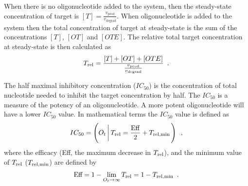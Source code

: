 \documentclass[a4paper,11pt]{article}
\newcommand{\vp}{v_{\mathrm{prod}}}
\newcommand{\vd}{v_{\mathrm{degrad}}}
\newcommand{\Trel}{T_{\rm{rel}}}
\newcommand{\Trelmin}{T_{\rm{rel,min}}}
\begin{document}
When there is no oligonucleotide added to the system, then the steady-state concentration of target is $[T]=\frac{\vp}{ \vd}$. When oligonucleotide is added to the system then the total concentration of target at steady-state is the sum of the concentrations $[T]$, $[OT]$ and $[OTE]$. The relative total target concentration at steady-state is then calculated as 
\begin{equation}
\Trel = \frac{[T]+[OT]+[OTE]}{\frac{\vp}{ \vd}} \enspace.
\end{equation}

The half maximal inhibitory concentration ($IC_{50}$) is the concentration of total nucleotide needed to inhibit the target concentration by half. The $IC_{50}$ is a measure of the potency of an oligonucleotide. A more potent oligonucleotide will have a lower $IC_{50}$ value. In mathematical terms the $IC_{50}$ value is defined as
\begin{equation}
IC_{50} = \left(O_t \left|\, \Trel = \frac{\mathrm{Eff}}{2}+\Trelmin \right.\right)  \enspace, \label{eq::IC50}
\end{equation}
where the efficacy (Eff, the maximum decrease in $\Trel$), and the minimum value of $\Trel$ ($\Trelmin$) are defined by
\begin{equation}
\textrm{Eff}=1-\lim_{O_t \to \infty} \Trel =1 - \Trelmin \label{eq:Eff} \enspace.
\end{equation}


\newpage
\end{document}
